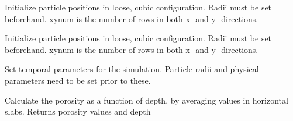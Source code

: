 \documentclass[letterpaper,10pt,english]{sphinxmanual}
\begin{document}
\begin{fulllineitems}
\begin{fulllineitems}
\end{fulllineitems}


\begin{fulllineitems}
\label{python_api:sphere.Spherebin.initRandomGridPos}
Initialize particle positions in loose, cubic configuration.
Radii must be set beforehand.
xynum is the number of rows in both x- and y- directions.

\end{fulllineitems}


\begin{fulllineitems}
\label{python_api:sphere.Spherebin.initRandomPos}
Initialize particle positions in loose, cubic configuration.
Radii must be set beforehand.
xynum is the number of rows in both x- and y- directions.

\end{fulllineitems}


\begin{fulllineitems}
\label{python_api:sphere.Spherebin.initTemporal}
Set temporal parameters for the simulation.
Particle radii and physical parameters need to be set
prior to these.

\end{fulllineitems}


\begin{fulllineitems}
\label{python_api:sphere.Spherebin.porosity}
Calculate the porosity as a function of depth, by averaging values
in horizontal slabs.
Returns porosity values and depth

\end{fulllineitems}


\end{fulllineitems}
\end{document}
